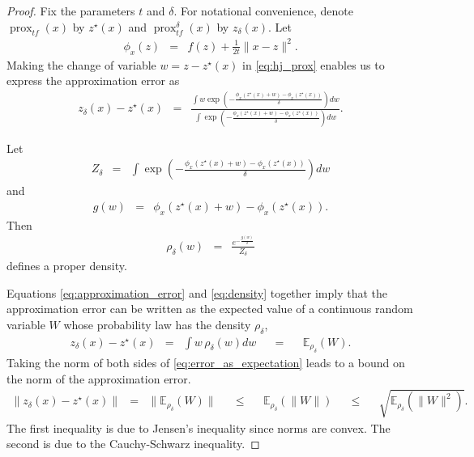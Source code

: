 \documentclass{article}
\newcommand{\E}{\mathbb{E}}
\newcommand{\prox}{\operatorname{prox}}
\newcommand{\hjprox}{\operatorname{prox}^{\delta}}
\newcommand{\amp}{\mathop{\:\:\,}\nolimits}
\theoremstyle{plain}
\theoremstyle{definition}
\theoremstyle{remark}
\begin{document}
\textit{}
\begin{proof}
Fix the parameters $t$ and $\delta$. For notational convenience, denote $\prox_{tf}(x)$ by $z^\star(x)$ and $\hjprox_{tf}(x)$ by $z_\delta(x)$. 
Let 
\begin{eqnarray}
    \phi_x(z) &=& f(z) + \frac{1}{2t}\|x-z\|^2.
\end{eqnarray}
Making the change of variable $w = z - z^\star(x)$ in \eqref{eq:hj_prox} enables us to express the approximation error as
\begin{eqnarray}
\label{eq:approximation_error}
    z_\delta(x) - z^\star(x) & = & \frac{\int w \exp\left(-\frac{\phi_x(z^\star(x) + w) - \phi_x(z^\star(x))}{\delta}\right) dw}{\int \exp\left(-\frac{\phi_x(z^\star(x) + w) - \phi_x(z^\star(x))}{\delta}\right) dw}.
\end{eqnarray}

Let 
\begin{eqnarray}
    Z_\delta & = & \int \exp\left(-\frac{\phi_x(z^\star(x) + w) - \phi_x(z^\star(x))}{\delta}\right) dw
\end{eqnarray}
and
\begin{eqnarray}
\label{eq:definition_g}
    g(w) & = & \phi_x(z^\star(x) + w ) - \phi_x(z^\star(x)).
\end{eqnarray}
Then
\begin{eqnarray}\label{eq:density}
    \rho_\delta(w) & = & \frac{e^{-\frac{g(w)}{\delta}}}{Z_\delta}
\end{eqnarray} 
defines a proper density. 

Equations \eqref{eq:approximation_error} and \eqref{eq:density} together imply that the approximation error can be written as the expected value of a continuous random variable $W$ whose probability law has the density $\rho_\delta$,
\begin{eqnarray}
\label{eq:error_as_expectation}
    z_\delta(x) - z^\star(x) & = & \int w \, \rho_\delta(w)dw \amp = \amp \E_{\rho_\delta}(W).
\end{eqnarray}
Taking the norm of both sides of \eqref{eq:error_as_expectation} leads to a bound on the norm of the approximation error.
\begin{eqnarray}
\label{eq:size_of_error_bound}
    \|z_\delta(x) - z^\star(x)\| & = & \|\E_{\rho_\delta}(W)\| \amp \leq \amp \E_{\rho_\delta}(\|W\|) \amp \leq \amp \sqrt{\E_{\rho_\delta}\left(\|W\|^2\right)}.
\end{eqnarray}
The first inequality is due to Jensen's inequality since norms are convex. The second is due to the Cauchy-Schwarz inequality. 


\end{proof}
\end{document}
